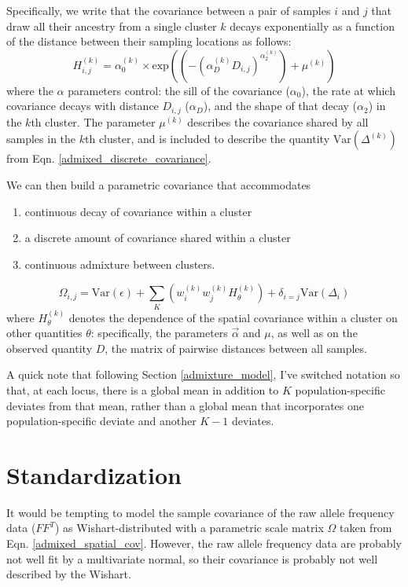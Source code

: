 \documentclass[12pt]{article}
\begin{document}
Specifically, we write that the covariance between a pair of samples $i$ and $j$
that draw all their ancestry from a single cluster $k$ decays exponentially as a function 
of the distance between their sampling locations as follows:
\begin{equation}
H^{(k)}_{i,j} = \alpha^{(k)}_0 \times \text{exp} \left( \left( -(\alpha^{(k)}_D D_{i,j})^{\alpha^{(k)}_2}\right) + \mu^{(k)}	\right)
\label{spatial_cov}
\end{equation}
where the $\alpha$ parameters control: 
the sill of the covariance ($\alpha_0$), 
the rate at which covariance decays with distance $D_{i,j}$ ($\alpha_D$),
and the shape of that decay ($\alpha_2$)
in the $k$th cluster.
The parameter $\mu^{(k)}$ describes the covariance shared by all samples in the $k$th cluster,
and is included to describe the quantity $\text{Var}(\Delta^{(k)})$ from Eqn. \eqref{admixed_discrete_covariance}.

We can then build a parametric covariance that accommodates 
\begin{enumerate}
\item continuous decay of covariance within a cluster
\item a discrete amount of covariance shared within a cluster
\item continuous admixture between clusters.
\end{enumerate}

\begin{equation}
\Omega_{i,j} = \text{Var}(\epsilon) + \sum\limits_K \left(	w^{(k)}_iw^{(k)}_j H^{(k)}_{\theta} 	\right) +
\delta_{i=j} \text{Var}(\Delta_i)
\label{admixed_spatial_cov}
\end{equation}
%
where $H^{(k)}_{\theta}$ denotes the dependence of the spatial covariance within a cluster 
on other quantities $\theta$: 
specifically, the parameters $\vec{\alpha}$ and $\mu$, as well as on the observed quantity $D$,
the matrix of pairwise distances between all samples.

A quick note that following Section \ref{admixture_model}, 
I've switched notation so that, at each locus, 
there is a global mean in addition to $K$ population-specific deviates from that mean,
rather than a global mean that incorporates one population-specific deviate and another $K-1$ deviates.


\section{Standardization}
It would be tempting to model the sample covariance of the raw allele frequency data ($FF^T$)
as Wishart-distributed with a parametric scale matrix $\Omega$ taken from Eqn. \eqref{admixed_spatial_cov}.
However, the raw allele frequency data are probably not well fit by a multivariate normal, 
so their covariance is probably not well described by the Wishart.
\end{document}
